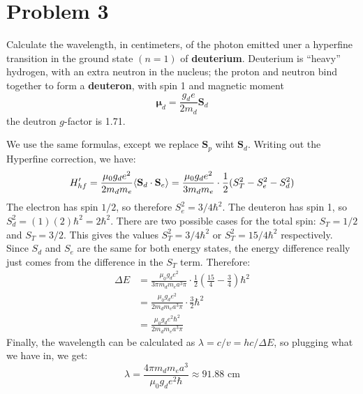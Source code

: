 \documentclass[10pt]{article}
\begin{document}
	\pagebreak

	\section*{Problem 3}
	Calculate the wavelength, in centimeters, of the photon emitted uner a hyperfine transition in the ground state $(n=1)$ of \textbf{deuterium}. Deuterium is ``heavy'' hydrogen, with an extra neutron in the nucleus; the proton and neutron bind together to form a \textbf{deuteron}, with spin 1 and magnetic moment 
	\[ \mathbf{\mu}_d = \frac{g_d e}{2m_d} \mathbf S_d\]
	the deutron $g$-factor is 1.71.

	\begin{solution}
		We use the same formulas, except we replace $\mathbf S_p$ wiht $\mathbf S_d$. Writing out the Hyperfine correction, we have:
		\[ H'_{hf} = \frac{\mu_0 g_de^2}{2m_dm_e}\langle \mathbf S_d \cdot \mathbf S_e \rangle = \frac{\mu_0g_de^2}{3m_dm_e} \cdot \frac 12 (S_T^2 - S_e^2 - S_d^2)\]
		The electron has spin $1/2$, so therefore $S_e^2 = 3/4 \hbar^2$. The deuteron has spin 1, so $S_d^2 = (1)(2) \hbar^2 = 2\hbar^2$. There are two possible cases for the total spin: $S_T = 1/2$ and $S_T = 3/2$. This gives the values $S_T^2 = 3/4 \hbar^2$ or $S_T^2 = 15/4\hbar^2$ respectively. Since $S_d$ and $S_e$ are the same for both energy states, the energy difference really just comes from the difference in the $S_T$ term. Therefore: 
		\begin{align*}
			\Delta E &= \frac{\mu_0 g_d e^2}{3\pi m_d m_e a^3 \pi} \cdot \frac12 \left( \frac{15}{4} - \frac 34\right) \hbar^2\\
			&= \frac{\mu_0 g_d e^2}{2m_dm_ea^3 \pi} \cdot \frac32 \hbar^2\\
			&= \frac{\mu_0 g_de^2\hbar^2}{2m_dm_ea^3\pi}
		\end{align*}
		Finally, the wavelength can be calculated as $\lambda = c/v = hc/\Delta E$, so plugging what we have in, we get: 
		\[ \lambda = \frac{4\pi m_dm_ea^3}{\mu_0 g_de^2\hbar} \approx 91.88 \text{ cm}\]
	\end{solution}

	\pagebreak
\end{document}
